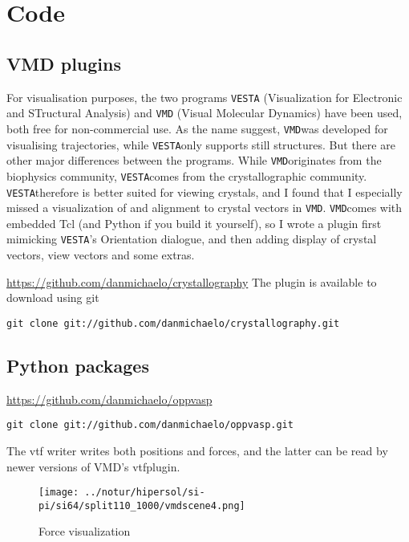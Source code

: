 \documentclass[11pt,bibliography=totoc,index=totoc]{scrbook}   %
\newcommand{\vesta}{{\texttt{VESTA}}} %
\newcommand{\vmd}{{\texttt{VMD}}} %
\begin{document}
\chapter{Code}

\section{VMD plugins}

For visualisation purposes, the two programs {\vesta} (Visualization for Electronic and STructural Analysis) and {\vmd} (Visual Molecular Dynamics) have been used, both free for non-commercial use.
As the name suggest, \vmd was developed for visualising trajectories, while \vesta only supports still structures.
But there are other major differences between the programs. While \vmd originates from the biophysics community, \vesta comes from the crystallographic community.
\vesta therefore is better suited for viewing crystals, and I found that I especially missed a visualization of and alignment to crystal vectors in \vmd.
\vmd comes with embedded Tcl (and Python if you build it yourself), so I wrote a plugin first mimicking \vesta's Orientation dialogue, and then adding 
display of crystal vectors, view vectors and some extras.

\url{https://github.com/danmichaelo/crystallography}
The plugin is available to download using git
\lstset{language=Bash}
\begin{lstlisting}
git clone git://github.com/danmichaelo/crystallography.git
\end{lstlisting}

\section{Python packages}

\url{https://github.com/danmichaelo/oppvasp}
\begin{lstlisting}
git clone git://github.com/danmichaelo/oppvasp.git
\end{lstlisting}

The vtf writer writes both positions and forces, and the latter can be read by newer versions of VMD's vtfplugin.

\begin{figure}[htp]
  \centering
  \texttt{[image: ../notur/hipersol/si-pi/si64/split110\_1000/vmdscene4.png]}
  \caption{Force visualization}
  \label{fig:forceviz}
\end{figure}



\end{document}
